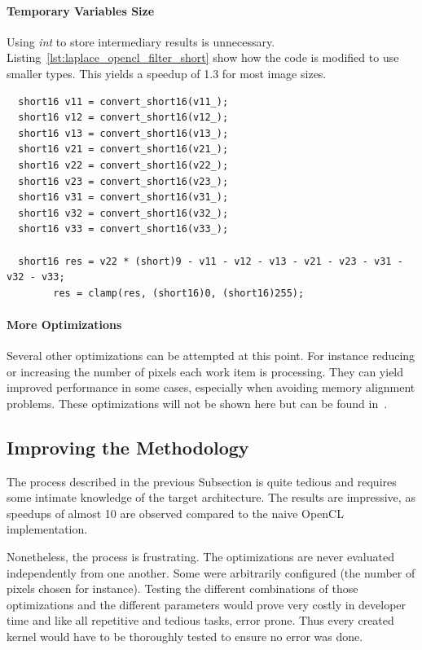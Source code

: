 \documentclass[11pt, a4paper, twoside]{montblanc}
\begin{document}
\paragraph{Temporary Variables Size} Using \textit{int} to store intermediary
results is unnecessary. Listing~\ref{lst:laplace_opencl_filter_short} show how
the code is modified to use smaller types. This yields a speedup of 1.3 for most
image sizes.

\begin{lstlisting}
  short16 v11 = convert_short16(v11_);
  short16 v12 = convert_short16(v12_);
  short16 v13 = convert_short16(v13_);
  short16 v21 = convert_short16(v21_);
  short16 v22 = convert_short16(v22_);
  short16 v23 = convert_short16(v23_);
  short16 v31 = convert_short16(v31_);
  short16 v32 = convert_short16(v32_);
  short16 v33 = convert_short16(v33_);

  short16 res = v22 * (short)9 - v11 - v12 - v13 - v21 - v23 - v31 - v32 - v33;
        res = clamp(res, (short16)0, (short16)255);
\end{lstlisting}

\paragraph{More Optimizations} Several other optimizations can be attempted at
this point. For instance reducing or increasing the number of pixels each work
item is processing. They can yield improved performance in some cases, especially
when avoiding memory alignment problems. These optimizations will not be shown
here but can be found in~\cite{opencl_arm_training}.

\subsection{Improving the Methodology}

The process described in the previous Subsection is quite tedious and requires
some intimate knowledge of the target architecture. The results are impressive,
as speedups of almost 10 are observed compared to the naive OpenCL
implementation.

Nonetheless, the process is frustrating. The optimizations are never evaluated
independently from one another. Some were arbitrarily configured (the number of
pixels chosen for instance). Testing the different combinations of those
optimizations and the different parameters would prove very costly in developer
time and like all repetitive and tedious tasks, error prone. Thus every created
kernel would have to be thoroughly tested to ensure no error was done.
\end{document}
